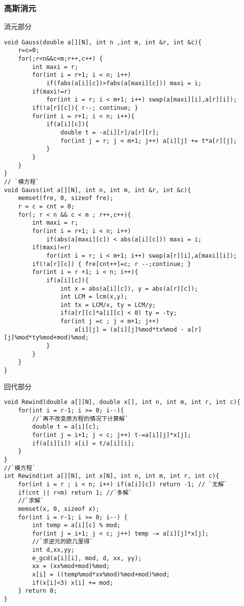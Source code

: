 \subsubsection{高斯消元}
消元部分
\begin{lstlisting}
void Gauss(double a[][N], int n ,int m, int &r, int &c){
    r=c=0;
    for(;r<n&&c<m;r++,c++) {
        int maxi = r;
        for(int i = r+1; i < n; i++)
            if(fabs(a[i][c])>fabs(a[maxi][c])) maxi = i;
        if(maxi!=r)
            for(int i = r; i < m+1; i++) swap(a[maxi][i],a[r][i]);
        if(!a[r][c]){ r--; continue; }
        for(int i = r+1; i < n; i++){
            if(a[i][c]){
                double t = -a[i][r]/a[r][r];
                for(int j = r; j < m+1; j++) a[i][j] += t*a[r][j];
            }
        }
    }
}
// `模方程`
void Gauss(int a[][N], int n, int m, int &r, int &c){
    memset(fre, 0, sizeof fre);
    r = c = cnt = 0;
    for(; r < n && c < m ; r++,c++){
        int maxi = r;
        for(int i = r+1; i < n; i++)
            if(abs(a[maxi][c]) < abs(a[i][c])) maxi = i;
        if(maxi!=r) 
            for(int i = r; i < m+1; i++) swap(a[r][i],a[maxi][i]);
        if(!a[r][c]) { fre[cnt++]=c; r --;continue; }
        for(int i = r +1; i < n; i++){
            if(a[i][c]){
                int x = abs(a[i][c]), y = abs(a[r][c]);
                int LCM = lcm(x,y);
                int tx = LCM/x, ty = LCM/y;
                if(a[r][c]*a[i][c] < 0) ty = -ty;
                for(int j =c ; j < m+1; j++)
                    a[i][j] = (a[i][j]%mod*tx%mod - a[r][j]%mod*ty%mod+mod)%mod;
            }
        }
    }
}
\end{lstlisting}

回代部分
\begin{lstlisting}
void Rewind(double a[][N], double x[], int n, int m, int r, int c){
    for(int i = r-1; i >= 0; i--){
        //`再不改变原方程的情况下计算解`
        double t = a[i][c];
        for(int j = i+1; j < c; j++) t-=a[i][j]*x[j];
        if(a[i][i]) x[i] = t/a[i][i];
    }
}
//`模方程`
int Rewind(int a[][N], int x[N], int n, int m, int r, int c){
    for(int i = r ; i < n; i++) if(a[i][c]) return -1; // `无解`
    if(cnt || r<m) return 1; //`多解`
    //`求解`
    memset(x, 0, sizeof x);
    for(int i = r-1; i >= 0; i--) {
        int temp = a[i][c] % mod;
        for(int j = i+1; j < c; j++) temp -= a[i][j]*x[j];
        //`求逆元的欧几里得`
        int d,xx,yy;
        e_gcd(a[i][i], mod, d, xx, yy);
        xx = (xx%mod+mod)%mod;
        x[i] = ((temp%mod*xx%mod)%mod+mod)%mod;
        if(x[i]<3) x[i] += mod;
    } return 0;
}
\end{lstlisting}

